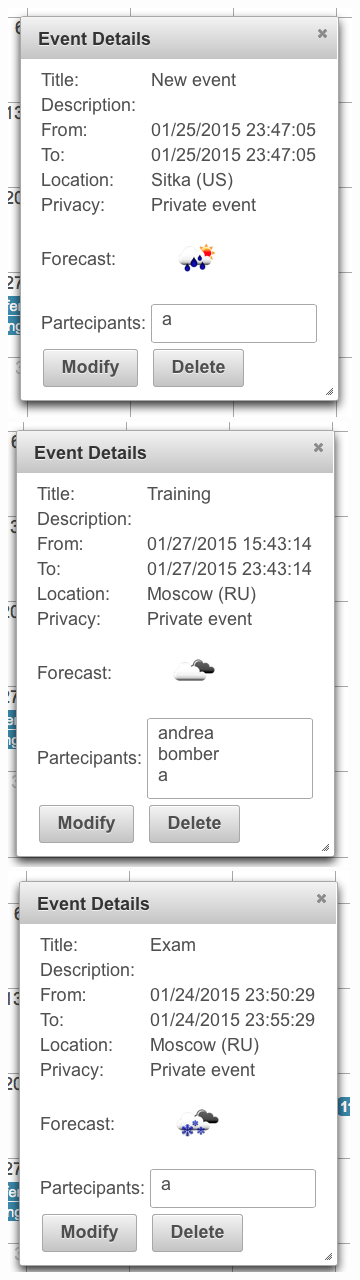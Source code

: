 \documentclass[10pt,a4paper,titlepage]{article}
\begin{document}
\begin{center}
\includegraphics[width=0.5\linewidth]{./images/15_creator_details_1}
\includegraphics[width=0.5\linewidth]{./images/16_creator_details_2}
\includegraphics[width=0.5\linewidth]{./images/17_creator_details_3}
\end{center}
\end{document}
